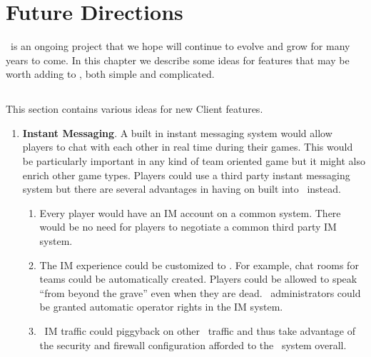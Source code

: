 %

\chapter{Future Directions}
\label{futuredirections}

\VTank\ is an ongoing project that we hope will continue to evolve and grow for many years to come. In this chapter we describe some ideas for features that may be worth adding to \VTank, both simple and complicated.

\section{\Client}

This section contains various ideas for new Client features.

\begin{enumerate}

\item \textbf{Instant Messaging}. A built in instant messaging system would allow players to chat with each other in real time during their games. This would be particularly important in any kind of team oriented game but it might also enrich other game types. Players could use a third party instant messaging system but there are several advantages in having on built into \Client\ instead.
\begin{enumerate}
\item Every player would have an IM account on a common system. There would be no need for players to negotiate a common third party IM system.
\item The IM experience could be customized to \VTank. For example, chat rooms for teams could be automatically created. Players could be allowed to speak ``from beyond the grave'' even when they are dead. \VTank\ administrators could be granted automatic operator rights in the IM system.
\item \VTank\ IM traffic could piggyback on other \VTank\ traffic and thus take advantage of the security and firewall configuration afforded to the \VTank\ system overall.
\end{enumerate}

\end{enumerate}